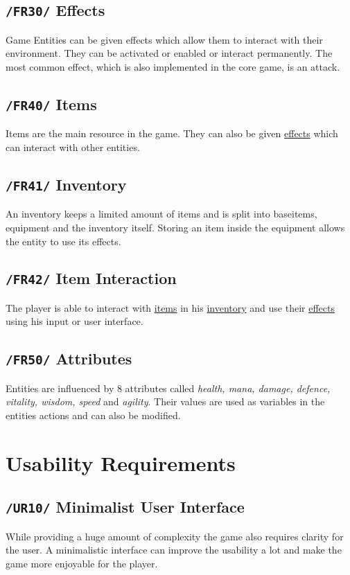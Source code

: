 \documentclass[11pt]{article}
\begin{document}
\subsection{\texttt{/FR30/} Effects}\label{subsec:fr30effects}
Game Entities can be given effects which allow them to interact with their environment.
They can be activated or enabled or interact permanently.
The most common effect, which is also implemented in the core game, is an attack.
\subsection{\texttt{/FR40/} Items}\label{subsec:fr40items}
Items are the main resource in the game. They can also be given \hyperref[subsec:fr30effects]{effects} which can interact with other entities.
\subsection{\texttt{/FR41/} Inventory}\label{subsec:fr41inventory}
An inventory keeps a limited amount of items and is split into baseitems, equipment and the inventory itself.
Storing an item inside the equipment allows the entity to use its effects.
\subsection{\texttt{/FR42/} Item Interaction}\label{subsec:pf22iteminteraction}
The player is able to interact with \hyperref[subsec:fr40items]{items} in his \hyperref[subsec:fr41inventory]{inventory} and use their \hyperref[subsec:fr30effects]{effects} using his input or user interface.
\subsection{\texttt{/FR50/} Attributes}\label{subsec:fr50attributes}
Entities are influenced by 8 attributes called \textit{health, mana, damage, defence, vitality, wisdom, speed} and \textit{agility}. Their values are used as variables in the entities actions and can also be modified.

\section{Usability Requirements}\label{sec:ur}
\subsection{\texttt{/UR10/} Minimalist User Interface}
While providing a huge amount of complexity the game also requires clarity for the user. A minimalistic interface can improve the usability a lot and make the game more enjoyable for the player.
\end{document}

